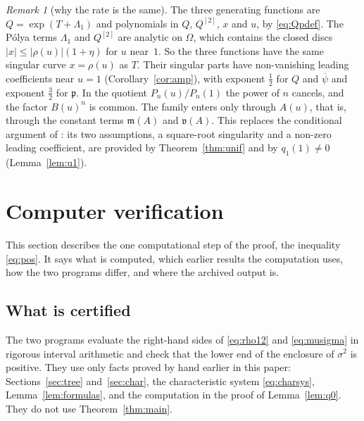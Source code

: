 \documentclass[11pt]{amsart}
\theoremstyle{definition}
\theoremstyle{remark}
\newtheorem*{remark*}{Remark}
\numberwithin{equation}{section}
\newcommand{\mean}{\mathfrak{m}}
\newcommand{\var}{\mathfrak{v}}
\newcommand{\pp}{\mathfrak{p}}
\newcommand{\psibar}{\overline{\psi}}
\newcommand{\abs}[1]{\lvert #1\rvert}
\begin{document}
\begin{remark*}[why the rate is the same]
The three generating functions are \(Q=\exp(T+\Lambda_1)\) and polynomials in \(Q\), \(Q^{[2]}\), \(x\) and \(u\), by \eqref{eq:Qpdef}. The P\'olya terms \(\Lambda_1\) and \(Q^{[2]}\) are analytic on \(\Omega\), which contains the closed discs \(\abs{x}\le\abs{\rho(u)}(1+\eta)\) for \(u\) near~\(1\). So the three functions have the same singular curve \(x=\rho(u)\) as \(T\). Their singular parts have non-vanishing leading coefficients near \(u=1\) (Corollary~\ref{cor:amp}), with exponent \(\frac12\) for \(Q\) and \(\psibar\) and exponent \(\frac32\) for \(\pp\). In the quotient \(P_n(u)/P_n(1)\) the power of \(n\) cancels, and the factor \(B(u)^n\) is common. The family enters only through \(A(u)\), that is, through the constant terms \(\mean(A)\) and \(\var(A)\). This replaces the conditional argument of \cite[Appendix]{CK}: its two assumptions, a square-root singularity and a non-zero leading coefficient, are provided by Theorem~\ref{thm:unif} and by \(q_1(1)\ne0\) (Lemma~\ref{lem:u1}).
\end{remark*}

\section{Computer verification}\label{sec:computer}

This section describes the one computational step of the proof, the inequality \eqref{eq:pos}. It says what is computed, which earlier results the computation uses, how the two programs differ, and where the archived output is.

\subsection{What is certified}

The two programs evaluate the right-hand sides of \eqref{eq:rho12} and \eqref{eq:musigma} in rigorous interval arithmetic and check that the lower end of the enclosure of \(\sigma^2\) is positive. They use only facts proved by hand earlier in this paper: Sections~\ref{sec:tree} and~\ref{sec:char}, the characteristic system \eqref{eq:charsys}, Lemma~\ref{lem:formulas}, and the computation in the proof of Lemma~\ref{lem:q0}. They do not use Theorem~\ref{thm:main}.
\end{document}
